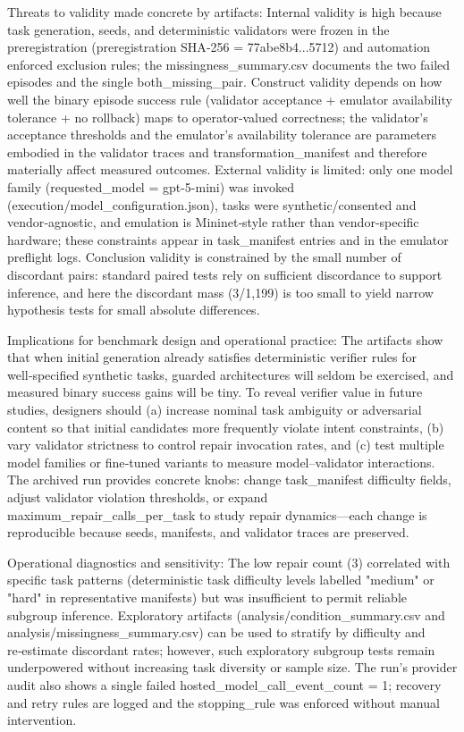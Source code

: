 \documentclass[conference]{IEEEtran}
\begin{document}
Threats to validity made concrete by artifacts: Internal validity is high because task generation, seeds, and deterministic validators were frozen in the preregistration (preregistration SHA‑256 = 77abe8b4...5712) and automation enforced exclusion rules; the missingness\_summary.csv documents the two failed episodes and the single both\_missing\_pair. Construct validity depends on how well the binary episode success rule (validator acceptance + emulator availability tolerance + no rollback) maps to operator‑valued correctness; the validator's acceptance thresholds and the emulator's availability tolerance are parameters embodied in the validator traces and transformation\_manifest and therefore materially affect measured outcomes. External validity is limited: only one model family (requested\_model = gpt-5-mini) was invoked (execution/model\_configuration.json), tasks were synthetic/consented and vendor‑agnostic, and emulation is Mininet‑style rather than vendor‑specific hardware; these constraints appear in task\_manifest entries and in the emulator preflight logs. Conclusion validity is constrained by the small number of discordant pairs: standard paired tests rely on sufficient discordance to support inference, and here the discordant mass (3/1,199) is too small to yield narrow hypothesis tests for small absolute differences.

Implications for benchmark design and operational practice: The artifacts show that when initial generation already satisfies deterministic verifier rules for well‑specified synthetic tasks, guarded architectures will seldom be exercised, and measured binary success gains will be tiny. To reveal verifier value in future studies, designers should (a) increase nominal task ambiguity or adversarial content so that initial candidates more frequently violate intent constraints, (b) vary validator strictness to control repair invocation rates, and (c) test multiple model families or fine‑tuned variants to measure model--validator interactions. The archived run provides concrete knobs: change task\_manifest difficulty fields, adjust validator violation thresholds, or expand maximum\_repair\_calls\_per\_task to study repair dynamics---each change is reproducible because seeds, manifests, and validator traces are preserved.

Operational diagnostics and sensitivity: The low repair count (3) correlated with specific task patterns (deterministic task difficulty levels labelled "medium" or "hard" in representative manifests) but was insufficient to permit reliable subgroup inference. Exploratory artifacts (analysis/condition\_summary.csv and analysis/missingness\_summary.csv) can be used to stratify by difficulty and re‑estimate discordant rates; however, such exploratory subgroup tests remain underpowered without increasing task diversity or sample size. The run's provider audit also shows a single failed hosted\_model\_call\_event\_count = 1; recovery and retry rules are logged and the stopping\_rule was enforced without manual intervention.
\end{document}

